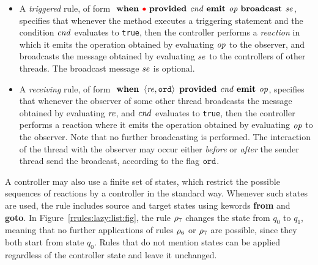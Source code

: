 
\begin{itemize}
\item
  A {\em triggered} rule, of form
\(
\mbox{ \bf when }\textcolor{red}{\bullet}\mbox{ \bf provided }{\it cnd}\mbox{ \bf emit }{\it op}\mbox{ \bf broadcast } {\it se}
\), 
specifies that whenever the method executes a triggering statement
and the condition ${\it cnd}$ evaluates to {\tt true}, then 
the controller performs a {\em reaction} in which it emits the operation
obtained by evaluating ${\it op}$
to the observer, and broadcasts the message obtained by evaluating ${\it se}$
to the controllers of other threads.
%
%
The broadcast message ${\it se}$ is optional.
\item
  A {\em receiving} rule, of form
\(
\mbox{ \bf when }\left\langle{\it re},{\tt ord}\right\rangle\mbox{ \bf provided }{\it cnd}\mbox{ \bf emit }{\it op}
\),
specifies that whenever the observer of some other thread broadcasts
the message obtained by evaluating ${\it re}$, 
and ${\it cnd}$ evaluates to {\tt true},
then the controller performs a
reaction where it emits the operation obtained by evaluating
${\it op}$ to the observer.
%
Note that no further broadcasting is
performed.
%
The interaction of the thread with the observer 
may occur either
{\it before} or {\it after}
the sender thread send the broadcast, according to the flag ${\tt ord}$.
\end{itemize}
A controller may also use a finite set of states,  which restrict the
possible sequences of reactions by a controller in the standard way.
Whenever such states are used, the rule includes source and target states
using kewords {\bf from} and {\bf goto}.
In Figure~\ref{rrules:lazy:list:fig}, the rule $\rho_7$
changes the state from $q_0$ to $q_1$, meaning that no further applications
of rules $\rho_6$ or $\rho_7$ are possible, since they both
start from state $q_0$. Rules that do not mention states can be
applied regardless of the controller state and leave it unchanged.

